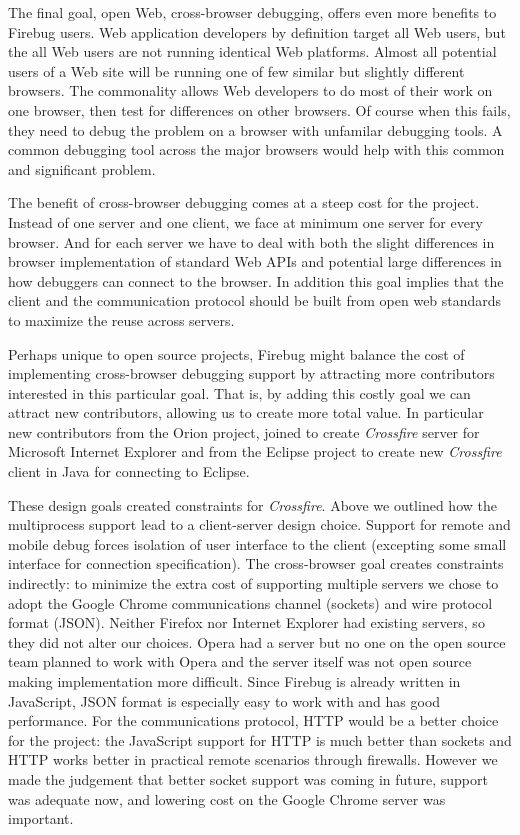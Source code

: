 The final goal, open Web, cross-browser debugging, offers even more benefits to Firebug users.  Web application developers by definition target all Web users, but the all Web users are not running identical Web platforms. Almost all potential users of a Web site will be running one of few similar but slightly different browsers. The commonality allows Web developers to do most of their work on one browser, then test for differences on other browsers. Of course when this fails, they need to debug the problem on a browser with unfamilar debugging tools. A common debugging tool across the major browsers would help with this common and significant problem.

The benefit of cross-browser debugging comes at a steep cost for the project. Instead of one server and one client, we face at minimum one server for every browser. And for each server we have to deal with both the slight differences in browser implementation of standard Web APIs and potential large differences in how debuggers can connect to the browser. In addition this goal implies that the client and the communication protocol should be built from open web standards to maximize the reuse across servers. 

Perhaps unique to open source projects, Firebug might balance the cost of implementing cross-browser debugging support by attracting more contributors interested in this particular goal. That is, by adding this costly goal we can attract new contributors, allowing us to create more total value. In particular new contributors from the Orion project\cite{orion}, joined to create \textit{Crossfire} server for Microsoft Internet Explorer and from the Eclipse project\cite{EclipseJSDT} to create new \textit{Crossfire} client in Java for connecting to Eclipse.

These design goals created constraints for \textit{Crossfire}. Above we outlined how the multiprocess support lead to a client-server design choice. Support for remote and mobile debug forces isolation of user interface to the client (excepting some small interface for connection specification). The cross-browser goal creates constraints indirectly: to minimize the extra cost of supporting multiple servers we chose to adopt the Google Chrome communications channel (sockets) and wire protocol format (JSON). Neither Firefox nor Internet Explorer had existing servers, so they did not alter our choices. Opera had a server but no one on the open source team planned to work with Opera and the server itself was not open source making implementation more difficult.  Since Firebug is already written in JavaScript, JSON format is especially easy to work with and has good performance\cite{JSON}.  For the communications protocol, HTTP would be a better choice for the project: the JavaScript support for HTTP is much better than sockets and HTTP works better in practical remote scenarios through firewalls.  However we made the judgement that better socket support was coming in future\cite{WebSockets}, support was adequate now, and lowering cost on the Google Chrome server was important.